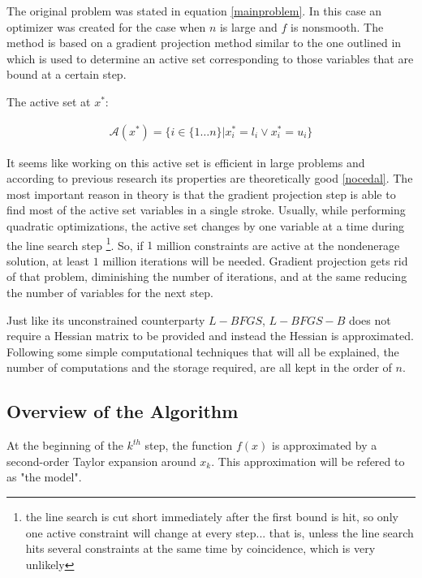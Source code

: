 The original problem was stated in equation \ref{mainproblem}.  In this case an optimizer was created for the case when $n$ is large and $f$ is nonsmooth.  The method is based on a gradient projection method similar to the one outlined in \citep{gradproj1, gradproj2} which is used to determine an active set corresponding to those variables that are bound at a certain step.  

The active set at $x^*$:

\begin{equation}
  \begin{aligned}
    \mathcal{A}(x^*) = \{ i \in \{1 \ldots n\} |  x^*_i = l_i \vee  x^*_i = u_i\}
  \end{aligned}
\end{equation}

It seems like working on this active set  is efficient in large problems and according to previous research its properties are theoretically good \ref{nocedal}.  The most important reason in theory is that the gradient projection step is able to find most of the active set variables in a single stroke.  Usually, while performing quadratic optimizations, the active set changes by one variable at a time during the line search step \footnote{the line search is cut short immediately after the first bound is hit, so only one active constraint will change at every step... that is, unless the line search hits several constraints at the same time by coincidence, which is very unlikely}.  So, if $1$ million constraints are active at the nondenerage solution, at least $1$ million iterations will be needed.   Gradient projection gets rid of that problem, diminishing the number of iterations, and at the same reducing the number of variables for the next step.

Just like its unconstrained counterparty $L-BFGS$, $L-BFGS-B$ does not require a Hessian matrix to be provided and instead the Hessian is approximated.  Following some simple computational techniques that will all be explained, the number of computations and the storage required, are all kept in the order of $n$.

\subsection{Overview of the Algorithm}

At the beginning of the $k^{th}$ step, the function $f(x)$ is approximated by a second-order Taylor expansion around $x_k$.  This approximation will be refered to as "the model".

